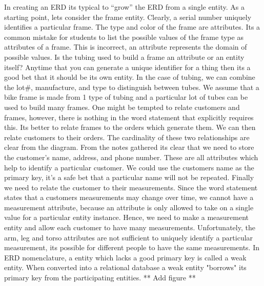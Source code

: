 \begin{enumerate}
\begin{onlysolution}
In creating an ERD its typical to “grow” the ERD from a single entity. As a 
starting point, lets consider the frame entity. Clearly, a serial number uniquely 
identifies a particular frame. The type and color of the frame are attributes. 
Its a common mistake for students to list the possible values of the frame type as 
attributes of a frame. This is incorrect, an attribute represents the domain of 
possible values. Is the tubing used to build a frame an attribute or an entity 
itself? Anytime that you can generate a unique identifier for a thing then its a good 
bet that it should be its own entity. In the case of tubing, we can combine the lot#, 
manufacture, and type to distinguish between tubes. We assume that a bike frame is made 
from 1 type of tubing and a particular lot of tubes can be used to build many frames. 
One might be tempted to relate customers and frames, however, there is nothing in the 
word statement that explicitly requires this. Its better to relate frames to the orders 
which generate them. We can then relate customers to their orders. The cardinality of 
these two relationships are clear from the diagram. From the notes gathered its clear 
that we need to store the customer’s name, address, and phone number. These are all 
attributes which help to identify a particular customer. We could use the customers 
name as the primary key, it’s a safe bet that a particular name will not be repeated. 
Finally we need to relate the customer to their measurements. Since the word statement 
states that a customers measurements may change over time, we cannot have a measurement 
attribute, because an attribute is only allowed to take on a single value for a particular 
entity instance. Hence, we need to make a measurement entity and allow each customer to have 
many measurements. Unfortunately, the arm, leg and torso attributes are not sufficient to 
uniquely identify a particular measurement, its possible for different people to have the 
same measurements. In ERD nomenclature, a entity which lacks a good primary key is called a 
weak entity. When converted into a relational database a weak entity "borrows" its primary key 
from the participating entities.
  ** Add figure **
\end{onlysolution}


\end{enumerate}
